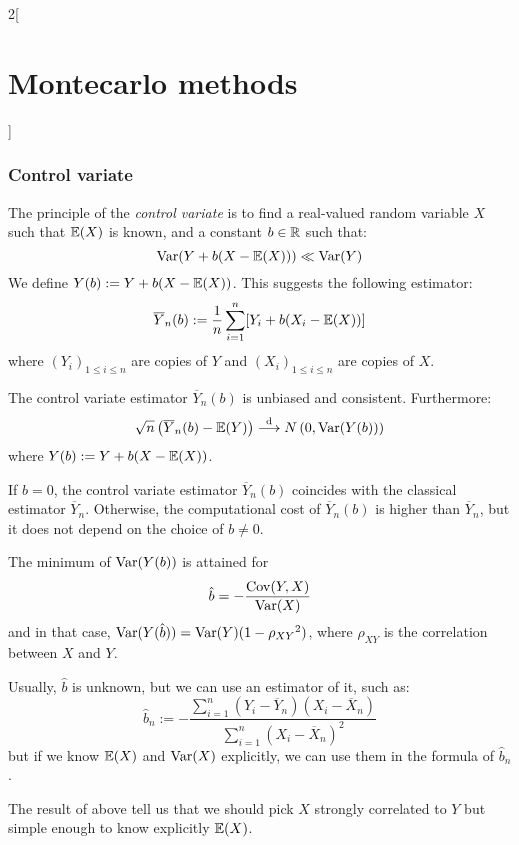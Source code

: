 \documentclass[../../../main_math.tex]{subfiles}
\begin{document}
\begin{multicols}{2}[\section{Montecarlo methods}]
  \subsubsection{Control variate}
  \begin{definition}
    The principle of the \emph{control variate} is to find a real-valued random variable $X$ such that $\mathbb{E}(X)$ is known, and a constant $b\in\mathbb{R}$ such that:
    $$
      \mathrm{Var}(Y+b(X-\mathbb{E}(X)))\ll \mathrm{Var}(Y)
    $$
    We define $Y(b):=Y+b(X-\mathbb{E}(X))$.
    This suggests the following estimator:
    $$
      \overline{Y}_n(b):=\frac{1}{n}\sum_{i=1}^n [Y_i+b(X_i-\mathbb{E}(X))]
    $$
    where ${(Y_i)}_{1\leq i\leq n}$ are \iid copies of $Y$ and ${(X_i)}_{1\leq i\leq n}$ are \iid copies of $X$.
  \end{definition}
  \begin{lemma}
    The control variate estimator $\overline{Y}_n(b)$ is unbiased and consistent. Furthermore:
    $$
      \sqrt{n}\left(\overline{Y}_n(b)-\mathbb{E}(Y)\right)\overset{\text{d}}{\longrightarrow}N\left(0,\mathrm{Var}(Y(b))\right)
    $$
    where $Y(b):=Y+b(X-\mathbb{E}(X))$.
  \end{lemma}
  \begin{remark}
    If $b=0$, the control variate estimator $\overline{Y}_n(b)$ coincides with the classical estimator $\overline{Y}_n$. Otherwise, the computational cost of $\overline{Y}_n(b)$ is higher than $\overline{Y}_n$, but it does not depend on the choice of $b\neq 0$.
  \end{remark}
  \begin{proposition}
    The minimum of $\mathrm{Var}(Y(b))$ is attained for $$\hat{b}= -\frac{\mathrm{Cov}(Y,X)}{\mathrm{Var}(X)}$$ and in that case, $\mathrm{Var}(Y(\hat{b}))=\mathrm{Var}(Y)(1-{\rho_{XY}}^2)$, where $\rho_{XY}$ is the correlation between $X$ and $Y$.
  \end{proposition}
  \begin{remark}
    Usually, $\hat{b}$ is unknown, but we can use an estimator of it, such as:
    $$
      \hat{b}_n:=-\frac{\sum_{i=1}^n (Y_i-\overline{Y}_n)(X_i-\overline{X}_n)}{\sum_{i=1}^n {(X_i-\overline{X}_n)}^2}
    $$
    but if we know $\mathbb{E}(X)$ and $\mathrm{Var}(X)$ explicitly, we can use them in the formula of $\hat{b}_n$.
  \end{remark}
  \begin{remark}
    The result of above tell us that we should pick $X$ strongly correlated to $Y$ but simple enough to know explicitly $\mathbb{E}(X)$.
  \end{remark}
  \begin{definition}

\end{definition}
\end{multicols}
\end{document}
